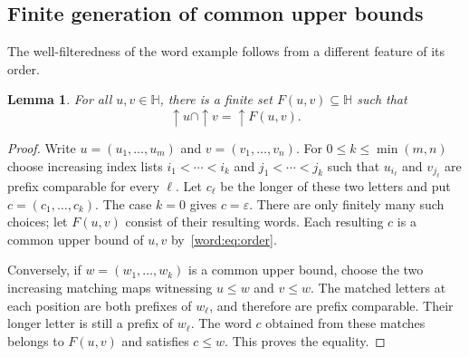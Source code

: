 \documentclass[fleqn,preprint,3p,a4paper]{elsarticle}
\newtheorem{lemma}[theorem]{Lemma}
\theoremstyle{definition}
\newcommand{\HH}{\mathbb H}
\begin{document}
\subsection{Finite generation of common upper bounds}
The well-filteredness of the word example follows from a different feature of its order.

\begin{lemma}\label{word:finite-upper-bounds}
For all $u,v\in\HH$, there is a finite set $F(u,v)\subseteq\HH$ such that
\[
 {\uparrow} u\cap{\uparrow} v={\uparrow} F(u,v).
\]
\end{lemma}
\begin{proof}
Write $u=(u_1,\ldots,u_m)$ and $v=(v_1,\ldots,v_n)$. For $0\leq k\leq\min(m,n)$ choose increasing index lists $i_1<\cdots<i_k$ and $j_1<\cdots<j_k$ such that $u_{i_\ell}$ and $v_{j_\ell}$ are prefix comparable for every $\ell$. Let $c_\ell$ be the longer of these two letters and put $c=(c_1,\ldots,c_k)$. The case $k=0$ gives $c=\varepsilon$. There are only finitely many such choices; let $F(u,v)$ consist of their resulting words. Each resulting $c$ is a common upper bound of $u,v$ by~\eqref{word:eq:order}.

Conversely, if $w=(w_1,\ldots,w_k)$ is a common upper bound, choose the two increasing matching maps witnessing $u\leq w$ and $v\leq w$. The matched letters at each position are both prefixes of $w_\ell$, and therefore are prefix comparable. Their longer letter is still a prefix of $w_\ell$. The word $c$ obtained from these matches belongs to $F(u,v)$ and satisfies $c\leq w$. This proves the equality.
\end{proof}
\end{document}

